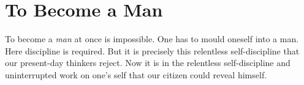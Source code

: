 \section{To Become a Man}

\begin{quotex}
To become a \emph{man} at once is impossible. One has to mould oneself into a man. Here discipline is required. But it is precisely this relentless self-discipline that our present-day thinkers reject. Now it is in the relentless self-discipline and uninterrupted work on one's self that our citizen could reveal himself.
\end{quotex}


